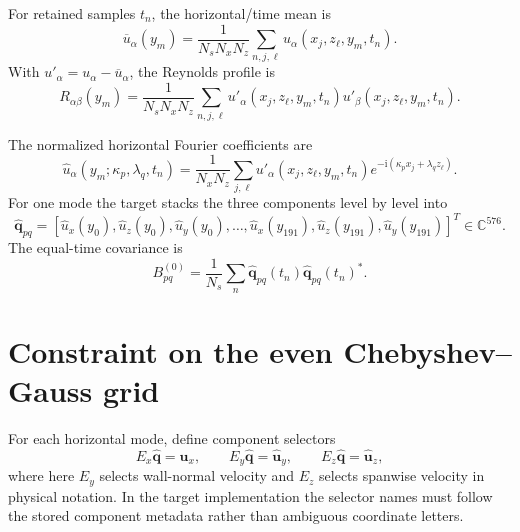 \documentclass[11pt]{article}
\newcommand{\ii}{\mathrm{i}}
\newcommand{\bfq}{\bm{q}}
\newcommand{\Ex}{E_x}
\newcommand{\Ey}{E_y}
\newcommand{\Ez}{E_z}
\begin{document}
For retained samples $t_n$, the horizontal/time mean is
\begin{equation}
  \overline{u}_{\alpha}(y_m)
  =\frac{1}{N_sN_xN_z}
  \sum_{n,j,\ell}
  u_{\alpha}(x_j,z_{\ell},y_m,t_n).
  \label{eq:mean}
\end{equation}
With $u'_{\alpha}=u_{\alpha}-\overline{u}_{\alpha}$, the Reynolds profile is
\begin{equation}
  R_{\alpha\beta}(y_m)
  =\frac{1}{N_sN_xN_z}
  \sum_{n,j,\ell}
  u'_{\alpha}(x_j,z_{\ell},y_m,t_n)
  u'_{\beta}(x_j,z_{\ell},y_m,t_n).
  \label{eq:reynolds}
\end{equation}

The normalized horizontal Fourier coefficients are
\begin{equation}
  \widehat{u}_{\alpha}(y_m;\kappa_p,\lambda_q,t_n)
  =\frac{1}{N_xN_z}\sum_{j,\ell}
  u'_{\alpha}(x_j,z_{\ell},y_m,t_n)
  e^{-\ii(\kappa_px_j+\lambda_qz_{\ell})}.
  \label{eq:fft}
\end{equation}
For one mode the target stacks the three components level by level into
\begin{equation}
  \widehat{\bfq}_{pq}
  =[\widehat{u}_x(y_0),\widehat{u}_z(y_0),\widehat{u}_y(y_0),\ldots,
    \widehat{u}_x(y_{191}),\widehat{u}_z(y_{191}),
    \widehat{u}_y(y_{191})]^T
  \in\mathbb{C}^{576}.
  \label{eq:modal_vector}
\end{equation}
The equal-time covariance is
\begin{equation}
  B^{(0)}_{pq}
  =\frac{1}{N_s}\sum_n
  \widehat{\bfq}_{pq}(t_n)\widehat{\bfq}_{pq}(t_n)^*.
  \label{eq:b0}
\end{equation}

\section{Constraint on the even Chebyshev--Gauss grid}

For each horizontal mode, define component selectors
\[
  \Ex\widehat{\bfq}=\widehat{\bm{u}}_x,\qquad
  \Ey\widehat{\bfq}=\widehat{\bm{u}}_y,\qquad
  \Ez\widehat{\bfq}=\widehat{\bm{u}}_z,
\]
where here $\Ey$ selects wall-normal velocity and $\Ez$ selects spanwise
velocity in physical notation.  In the target implementation the selector
names must follow the stored component metadata rather than ambiguous
coordinate letters.
\end{document}
